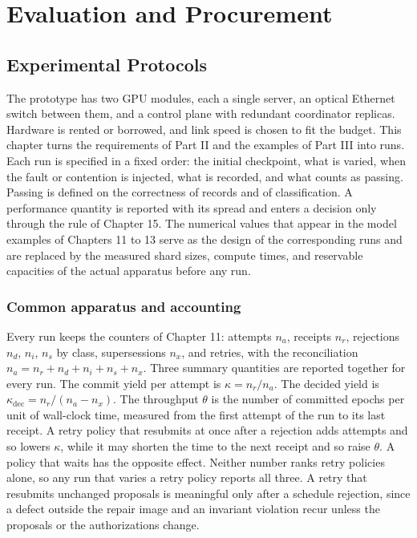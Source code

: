 \documentclass[11pt,openany]{book}
\theoremstyle{remark}
\begin{document}
\part{Evaluation and Procurement}

\chapter{Experimental Protocols}

The prototype has two GPU modules, each a single server, an optical Ethernet switch between them, and a control plane with redundant coordinator replicas. Hardware is rented or borrowed, and link speed is chosen to fit the budget. This chapter turns the requirements of Part II and the examples of Part III into runs. Each run is specified in a fixed order: the initial checkpoint, what is varied, when the fault or contention is injected, what is recorded, and what counts as passing. Passing is defined on the correctness of records and of classification. A performance quantity is reported with its spread and enters a decision only through the rule of Chapter 15. The numerical values that appear in the model examples of Chapters 11 to 13 serve as the design of the corresponding runs and are replaced by the measured shard sizes, compute times, and reservable capacities of the actual apparatus before any run.

\section{Common apparatus and accounting}

Every run keeps the counters of Chapter 11: attempts $n_a$, receipts $n_r$, rejections $n_d$, $n_i$, $n_s$ by class, supersessions $n_x$, and retries, with the reconciliation $n_a=n_r+n_d+n_i+n_s+n_x$. Three summary quantities are reported together for every run. The commit yield per attempt is $\kappa=n_r/n_a$. The decided yield is $\kappa_{\mathrm{dec}}=n_r/(n_a-n_x)$. The throughput $\theta$ is the number of committed epochs per unit of wall-clock time, measured from the first attempt of the run to its last receipt. A retry policy that resubmits at once after a rejection adds attempts and so lowers $\kappa$, while it may shorten the time to the next receipt and so raise $\theta$. A policy that waits has the opposite effect. Neither number ranks retry policies alone, so any run that varies a retry policy reports all three. A retry that resubmits unchanged proposals is meaningful only after a schedule rejection, since a defect outside the repair image and an invariant violation recur unless the proposals or the authorizations change.
\end{document}
